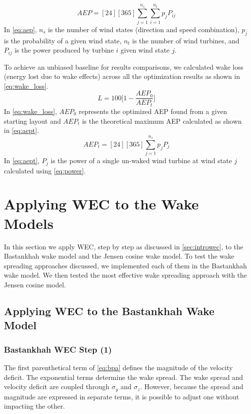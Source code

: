 \documentclass{jpconf}
\begin{document}
\begin{equation} \label{eq:aep}
AEP = [24][365]\sum_{j=1}^{n_s} \sum_{i=1}^{n_t} p_j P_{ij}  
\end{equation}
%
 In \cref{eq:aep}, $n_s$ is the number of wind states (direction and speed combination), $p_j$ is the probability of a given wind state, $n_t$ is the number of wind turbines, and $P_{ij}$ is the power produced by turbine $i$ given wind state $j$.

To achieve an unbiased baseline for results comparisons, we calculated wake loss (energy lost due to wake effects) across all the optimization results as shown in \cref{eq:wake_loss}.
%
\begin{equation} \label{eq:wake_loss}
	L = 100 \bigg[ 1 - \frac{AEP_0}{AEP_t} \bigg]
\end{equation}
%
In \cref{eq:wake_loss}, $AEP_0$ represents the optimized AEP found from a given starting layout and $AEP_t$ is the theoretical maximum AEP calculated as shown in \cref{eq:aept}. 
%
\begin{equation} \label{eq:aept}
	AEP_t = [24][365]\sum_{j=1}^{n_s}p_j P_j
\end{equation}
%
In \cref{eq:aept}, $P_j$ is the power of a single un-waked wind turbine at wind state $j$ calculated using \cref{eq:power}. 

\section{Applying WEC to the  Wake Models} \label{sec:application}
In this section we apply WEC, step by step as discussed in \cref{sec:introwec}, to the Bastankhah wake model and the Jensen cosine wake model. To test the wake spreading approaches discussed, we implemented each of them in the Bastankhah  wake model. We then tested the most effective wake spreading approach with the Jensen cosine model.

\subsection{Applying WEC to the Bastankhah Wake Model}

\subsubsection{Bastankhah WEC Step (1)}
The first parenthetical term of \cref{eq:bpa} defines the magnitude of the velocity deficit. The exponential terms determine the wake spread. The wake spread and velocity deficit are coupled through $\sigma_y$ and $\sigma_z$. However, because the spread and magnitude are expressed in separate terms, it is possible to adjust one without impacting the other. 
\end{document}
